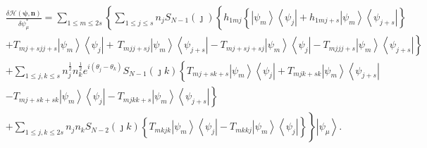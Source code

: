 \documentclass[aps,preprint]{revtex4}%
\begin{document}
\begin{align}
&  \frac{\delta\mathcal{H}\left(  \mathbf{\psi,n}\right)  }{\delta\psi_{\mu
}^{\ast}}=\sum_{1\leq m\leq2s}\left\{  \sum_{1\leq j\leq s}n_{j}S_{N-1}\left(
\jmath\right)  \left\{  h_{1mj}\left\{  \left\vert \psi_{m}\right\rangle
\left\langle \psi_{j}\right\vert +h_{1mj+s}\left\vert \psi_{m}\right\rangle
\left\langle \psi_{j+s}\right\vert \right\}  \right.  \right.  \nonumber\\
&  \left.  +T_{mj+sjj+s}\left\vert \psi_{m}\right\rangle \left\langle \psi
_{j}\right\vert +\,T_{mjj+sj}\left\vert \psi_{m}\right\rangle \left\langle
\psi_{j+s}\right\vert -T_{mj+sj+sj}\left\vert \psi_{m}\right\rangle
\left\langle \psi_{j}\right\vert -T_{mjjj+s}\left\vert \psi_{m}\right\rangle
\left\langle \psi_{j+s}\right\vert \right\}  \nonumber\\
&  +\sum_{1\leq j,k\leq s}n_{j}^{\frac{1}{2}}n_{k}^{\frac{1}{2}}e^{i\left(
\theta_{j}-\theta_{k}\right)  }S_{N-1}\left(  \jmath k\right)  \left\{
T_{mj+sk+s}\left\vert \psi_{m}\right\rangle \left\langle \psi_{j}\right\vert
+T_{mjk+sk}\left\vert \psi_{m}\right\rangle \left\langle \psi_{j+s}\right\vert
\right.  \nonumber\\
&  \left.  -T_{mj+sk+sk}\left\vert \psi_{m}\right\rangle \left\langle \psi
_{j}\right\vert -T_{mjkk+s}\left\vert \psi_{m}\right\rangle \left\langle
\psi_{j+s}\right\vert \right\}  \nonumber\\
&  +\sum_{1\leq j,k\leq2s}n_{j}n_{k}S_{N-2}\left(  \jmath k\right)  \left.
\overset{}{\left\{  T_{mkjk}\left\vert \psi_{m}\right\rangle \left\langle
\psi_{j}\right\vert -T_{mkkj}\left\vert \psi_{m}\right\rangle \left\langle
\psi_{j}\right\vert \right\}  }\right\}  \left\vert \psi_{\mu}\right\rangle .
\end{align}
\end{document}
